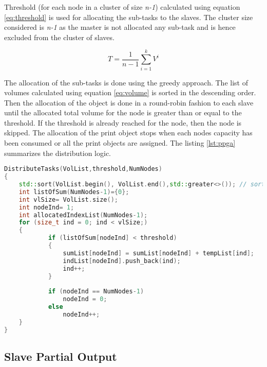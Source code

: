 Threshold (for each node in a cluster of size \textit{n-1}) calculated using equation \ref{eq:threshold} is used for allocating the sub-tasks to the slaves. The cluster size considered is \textit{n-1} as the master is not allocated any sub-task and is hence excluded from the cluster of slaves.

\begin{equation}
\label{eq:threshold}
T =\frac{1}{n-1}\sum\limits_{i=1}^{k}{V^i}
\end{equation}

The allocation of the sub-tasks is done using the greedy approach. The list of volumes calculated using equation \ref{eq:volume} is sorted in the  descending order. Then the allocation of the object is done in a round-robin fashion to each slave  until the allocated total volume  for the node is greater than or equal to the threshold. If the threshold is already reached for the node, then the node is skipped. The allocation of the print object stops when each node\textquotesingle s capacity has been consumed or all the print objects are assigned. The listing \ref{lst:ppga} summarizes the distribution logic.

\begin{lstlisting}[language=C++,label={lst:ppga},caption={Distribute Tasks- Greedy Approach}]
DistributeTasks(VolList,threshold,NumNodes)
{
	std::sort(VolList.begin(), VolList.end(),std::greater<>()); // sort in descending order
	int listOfSum(NumNodes-1)={0};
	int vlSize= VolList.size();
	int nodeInd= 1;
	int allocatedIndexList(NumNodes-1);
	for (size_t ind = 0; ind < vlSize;)
	{
			if (listOfSum[nodeInd] < threshold)
			{
				sumList[nodeInd] = sumList[nodeInd] + tempList[ind];
				indList[nodeInd].push_back(ind);
				ind++;
			}
			
			if (nodeInd == NumNodes-1)
				nodeInd = 0;
			else 
				nodeInd++;
	}
}
\end{lstlisting}

\subsection{Slave Partial Output} \label{SRepoComp}

